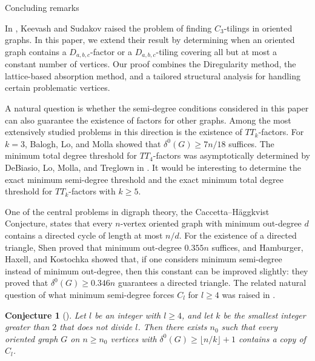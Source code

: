 \documentclass[11pt,a4paper,reqno]{amsart}
\makeatletter
\renewcommand\section{\@startsection{section}{1}%
  \z@{-1.0\linespacing\@plus-.7\linespacing}{1\linespacing}%
  {\normalfont\bfseries\large\centering}}
\newtheorem{conjecture}{Conjecture}[section]
\theoremstyle{definition} %
\makeatother
\begin{document}
\section{Concluding remarks}\label{SEC-remark}

In \cite{keevashJCTB99}, Keevash and Sudakov raised the problem of finding $C_3$-tilings in oriented graphs. In this paper, we extend their result by determining when an oriented graph contains a $D_{a,b,c}$-factor or a $D_{a,b,c}$-tiling covering all but at most a constant number of vertices. Our proof combines the Diregularity method, the lattice-based absorption method, and a tailored structural analysis for handling certain problematic vertices.

A natural question is whether the semi-degree conditions considered in this paper can also guarantee the existence of factors for other graphs. Among the most extensively studied problems in this direction is the existence of $TT_k$-factors. For $k=3$, Balogh, Lo, and Molla \cite{baloghJCTB124} showed that $\delta^{0}(G)\geqslant 7n/18$ suffices. The minimum total degree threshold for $TT_4$-factors was asymptotically determined by DeBiasio, Lo, Molla, and Treglown in \cite{debiasioSJDM35}. It would be interesting to determine the exact minimum semi-degree threshold and the exact minimum total degree threshold for $TT_k$-factors with $k\geqslant 5$.

One of the central problems in digraph theory, the Caccetta--H\"aggkvist Conjecture, states that every $n$-vertex oriented graph with minimum out-degree $d$ contains a directed cycle of length at most $n/d$. For the existence of a directed triangle, Shen \cite{shenJCTB74} proved that minimum out-degree $0.355n$ suffices, and Hamburger, Haxell, and Kostochka \cite{hamburgeEJC14} showed that, if one considers minimum semi-degree instead of minimum out-degree, then this constant can be improved slightly: they proved that $\delta^0(G)\geqslant 0.346n$ guarantees a directed triangle. The related natural question of what minimum semi-degree forces $C_l$ for $l\geqslant 4$ was raised in \cite{kellyJCTB100}.

\begin{conjecture}[\cite{kellyJCTB100}]
    Let $l$ be an integer with $l\geqslant 4$, and let $k$ be the smallest integer greater than $2$ that does not divide $l$.
    Then there exists $n_0$ such that every oriented graph $G$ on $n\geqslant n_0$ vertices with $\delta^{0}(G)\geqslant \lfloor n/k\rfloor+1$ contains a copy of $C_l$.
\end{conjecture}
\end{document}
